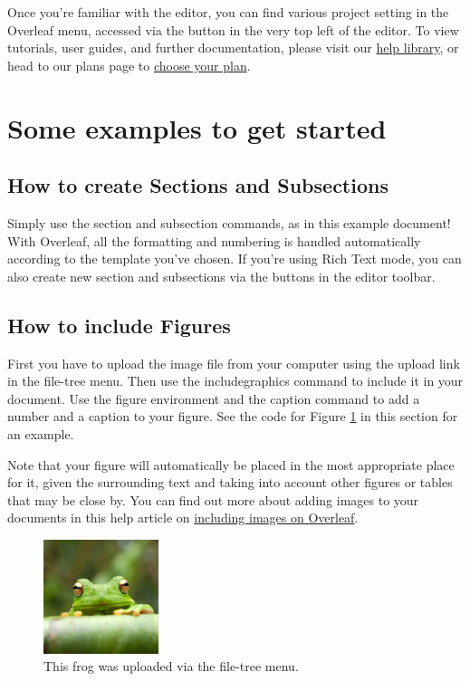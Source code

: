 \documentclass{article}
\begin{document}
\begin{abstract .}
Once you're familiar with the editor, you can find various project setting in the Overleaf menu, accessed via the button in the very top left of the editor. To view tutorials, user guides, and further documentation, please visit our \href{https://www.overleaf.com/learn}{help library}, or head to our plans page to \href{https://www.overleaf.com/user/subscription/plans}{choose your plan}.

\section{Some examples to get started}

\subsection{How to create Sections and Subsections}

Simply use the section and subsection commands, as in this example document! With Overleaf, all the formatting and numbering is handled automatically according to the template you've chosen. If you're using Rich Text mode, you can also create new section and subsections via the buttons in the editor toolbar.

\subsection{How to include Figures}

First you have to upload the image file from your computer using the upload link in the file-tree menu. Then use the includegraphics command to include it in your document. Use the figure environment and the caption command to add a number and a caption to your figure. See the code for Figure \ref{fig:frog} in this section for an example.

Note that your figure will automatically be placed in the most appropriate place for it, given the surrounding text and taking into account other figures or tables that may be close by. You can find out more about adding images to your documents in this help article on \href{https://www.overleaf.com/learn/how-to/Including_images_on_Overleaf}{including images on Overleaf}.

\begin{figure}
\centering
\includegraphics[width=0.3\textwidth]{frog.jpg}
\caption{\label{fig:frog}This frog was uploaded via the file-tree menu.}
\end{figure}


\end{abstract .}
\end{document}
